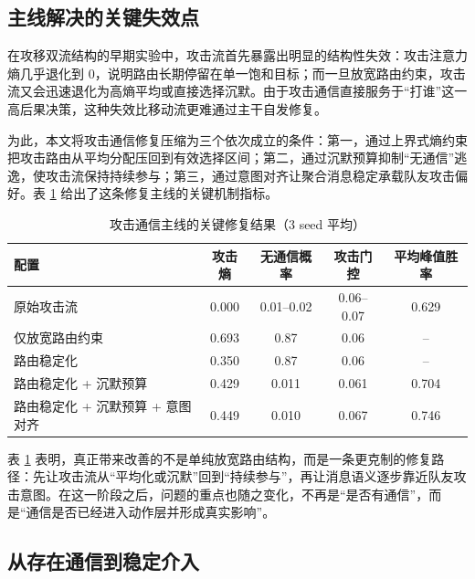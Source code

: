 \subsection{主线解决的关键失效点}

在攻移双流结构的早期实验中，攻击流首先暴露出明显的结构性失效：攻击注意力熵几乎退化到 $0$，说明路由长期停留在单一饱和目标；而一旦放宽路由约束，攻击流又会迅速退化为高熵平均或直接选择沉默。由于攻击通信直接服务于“打谁”这一高后果决策，这种失效比移动流更难通过主干自发修复。

为此，本文将攻击通信修复压缩为三个依次成立的条件：第一，通过上界式熵约束把攻击路由从平均分配压回到有效选择区间；第二，通过沉默预算抑制“无通信”逃逸，使攻击流保持持续参与；第三，通过意图对齐让聚合消息稳定承载队友攻击偏好。表 \ref{tab:attack_repair} 给出了这条修复主线的关键机制指标。

\begin{table}[htbp]
    \centering
    \caption{攻击通信主线的关键修复结果（3 seed 平均）}
    \label{tab:attack_repair}
    {\renewcommand{\arraystretch}{1.28}
    \setlength{\extrarowheight}{1pt}
    \setlength{\tabcolsep}{7pt}
    \begin{tabular}{lcccc}
        \toprule
        配置 & 攻击熵 & 无通信概率 & 攻击门控 & 平均峰值胜率 \\
        \midrule
        原始攻击流 & 0.000 & 0.01--0.02 & 0.06--0.07 & 0.629 \\
        仅放宽路由约束 & 0.693 & 0.87 & 0.06 & -- \\
        路由稳定化 & 0.350 & 0.87 & 0.06 & -- \\
        路由稳定化 + 沉默预算 & 0.429 & 0.011 & 0.061 & 0.704 \\
        路由稳定化 + 沉默预算 + 意图对齐 & 0.449 & 0.010 & 0.067 & 0.746 \\
        \bottomrule
    \end{tabular}
    }
\end{table}

表 \ref{tab:attack_repair} 表明，真正带来改善的不是单纯放宽路由结构，而是一条更克制的修复路径：先让攻击流从“平均化或沉默”回到“持续参与”，再让消息语义逐步靠近队友攻击意图。在这一阶段之后，问题的重点也随之变化，不再是“是否有通信”，而是“通信是否已经进入动作层并形成真实影响”。

\subsection{从存在通信到稳定介入}

